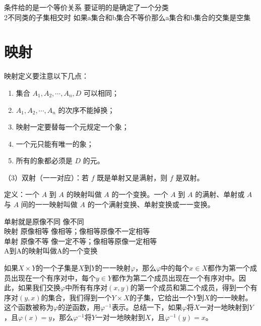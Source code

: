 \begin{note}[集合A的任一个等价关系都可确定A的一个分类]
条件给的是一个等价关系 要证明的是确定了一个分类 \\
2不同类的子集相交时 如果a集合和b集合不等价那么a集合和b集合的交集是空集
\end{note}

\section{映射}

\begin{definition}[映射]
映射定义要注意以下几点：
\begin{enumerate}
  \item 集合 $A_1,A_2,\cdots,A_n,D$ 可以相同；
  \item $A_1,A_2,\cdots,A_n$ 的次序不能掉换；
  \item 映射一定要替每一个元规定一个象；
  \item 一个元只能有唯一的象；
  \item 所有的象都必须是 $D$ 的元。
\end{enumerate}
\end{definition}

\begin{definition}[单射、满射与双射]
（3）双射（一一对应）：若 $f$ 既是单射又是满射，则 $f$ 是双射。

定义：一个 $A$ 到 $A$ 的映射叫做 $A$ 的一个变换。一个 $A$ 到 $A$ 的满射、单射或 $A$ 与 $A$ 间的一一映射叫做 $A$ 的一个满射变换、单射变换或一一变换。
\end{definition}

\begin{note}[单射满射]
单射就是原像不同 像不同 \\
映射 原像相等 像相等；像相等原像不一定相等 \\
单射 原像不等 像一定不等；像相等原像一定相等 \\
A到A的映射叫做A的一个变换
\end{note}

\begin{note}[逆映射]
如果$X\times Y$的一个子集是$X$到$Y$的一一映射$\varphi$，那么$\varphi$中的每个$x\in X$都作为第一个成员出现在一个有序对中，每个$y\in Y$都作为第二个成员出现在一个有序对中。因此，如果我们交换$\varphi$中所有有序对$(x,y)$的第一个成员和第二个成员，得到一个有序对$(y,x)$的集合，我们得到一个$Y\times X$的子集，它给出一个$Y$到$X$的一一映射。这个函数被称为$\varphi$的逆函数，用$\varphi^{-1}$表示。总结一下，如果$\varphi$将$X$一对一地映射到$Y$，且$\varphi(x)=y$，那么$\varphi^{-1}$将$Y$一对一地映射到$X$，且$\varphi^{-1}(y)=x$。
\end{note}

